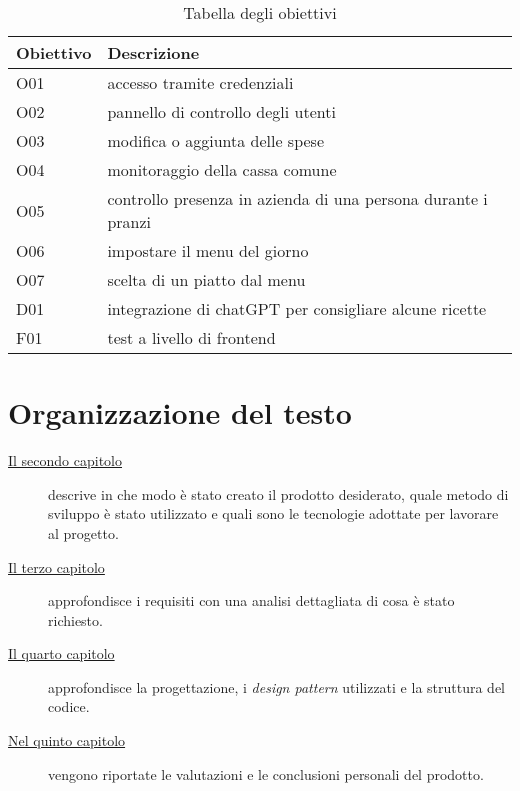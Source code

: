\begin{table}[htb]%
    \caption{Tabella degli obiettivi}
    \label{tab:obiettivi-richiesti}
    \begin{tabularx}{\textwidth}{lX}
    \hline
    \textbf{Obiettivo} & \textbf{Descrizione} \\
    \hline\hline
    O01     & accesso tramite credenziali \\
    \hline
    O02     & pannello di controllo degli utenti \\
    \hline
    O03     & modifica o aggiunta delle spese \\
    \hline
    O04     & monitoraggio della cassa comune \\
    \hline
    O05     & controllo presenza in azienda di una persona durante i pranzi \\
    \hline
    O06     & impostare il menu del giorno \\
    \hline
    O07     & scelta di un piatto dal menu \\
    \hline
    D01     & integrazione di chatGPT per consigliare alcune ricette \\
    \hline
    F01     & test a livello di frontend \\
    \hline
    \end{tabularx}
\end{table}%

\newpage

\section{Organizzazione del testo}

\begin{description}
    \item[{\hyperref[cap:processi-metodologie]{Il secondo capitolo}}] descrive in che modo è stato creato il prodotto desiderato, quale metodo di sviluppo è stato utilizzato e quali sono le tecnologie adottate per lavorare al progetto.
    
    
    \item[{\hyperref[cap:analisi-requisiti]{Il terzo capitolo}}] approfondisce i requisiti con una analisi dettagliata di cosa è stato richiesto.
    
    \item[{\hyperref[cap:progettazione-codifica]{Il quarto capitolo}}] approfondisce la progettazione, i \emph{design pattern} utilizzati e la struttura del codice.
    
    
    \item[{\hyperref[cap:conclusioni]{Nel quinto capitolo}}] vengono riportate le valutazioni e le conclusioni personali del prodotto.
\end{description}


